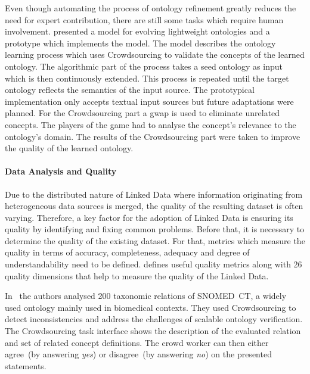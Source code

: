 Even though automating the process of ontology refinement greatly reduces the need for expert contribution, there are still some tasks which require human involvement. \cite{wohlgenannt2013} presented a model for evolving lightweight ontologies and a prototype which implements the model. The model describes the ontology learning process which uses Crowdsourcing to validate the concepts of the learned ontology. The algorithmic part of the process takes a seed ontology as input which is then continuously extended. This process is repeated until the target ontology reflects the semantics of the input source. The prototypical implementation only accepts textual input sources but future adaptations were planned. 
For the Crowdsourcing part a \gls{gwap} is used to eliminate unrelated concepts. The players of the game had to analyse the concept's relevance to the ontology's domain. The results of the Crowdsourcing part were taken to improve the quality of the learned ontology. 

\paragraph{Data Analysis and Quality}
Due to the distributed nature of Linked Data where information originating from heterogeneous data sources is merged, the quality of the resulting
dataset is often varying. Therefore, a key factor for the adoption of Linked Data is ensuring its quality by identifying and fixing common problems. Before that, it is necessary to determine the quality of the existing dataset. For that, metrics which measure the quality in terms of accuracy, completeness, adequacy and degree of understandability need to be defined. \cite{zaveri2016} defines useful quality metrics along with 26 quality dimensions that help to measure the quality of the Linked Data.

In~\cite{mortensen2015} the authors analysed 200 taxonomic relations of SNOMED~CT, a widely used ontology mainly used in biomedical contexts. They used Crowdsourcing to detect inconsistencies and address the challenges of scalable ontology verification. The Crowdsourcing task interface shows the description of the evaluated relation and set of related concept definitions. The crowd worker can then either agree~(by answering \emph{yes}) or disagree~(by answering \emph{no}) on the presented statements. 


